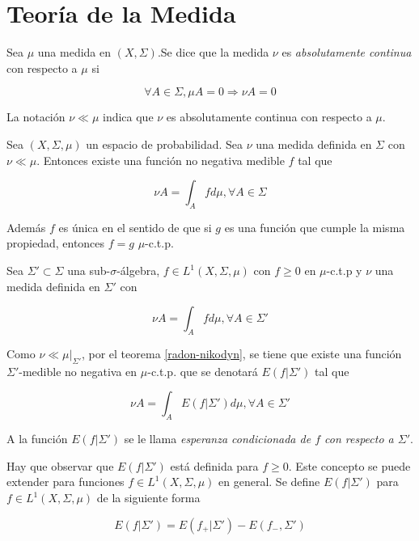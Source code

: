 \section{Teoría de la Medida}

\begin{definicion}
	Sea $\mu$ una medida en $(X,\Sigma)$.Se dice que la medida $\nu$ es \textit{absolutamente continua} con respecto a $\mu$ si
	
	\begin{equation}
		\forall A \in \Sigma, \mu A = 0 \Rightarrow \nu A = 0
	\end{equation}
	
	La notación $\nu \ll \mu$ indica que $\nu$ es absolutamente continua con respecto a $\mu$.
\end{definicion}

\begin{teorema}\label{radon-nikodyn}
	Sea $(X,\Sigma,\mu)$ un espacio de probabilidad. Sea $\nu$ una medida definida en $\Sigma$ con $\nu \ll \mu$. Entonces existe una función no negativa medible $f$ tal que
	
	\begin{equation}
		\nu A = \int_A f d\mu, \forall A \in \Sigma
	\end{equation}
	
	Además $f$ es única en el sentido de que si $g$ es una función que cumple la misma propiedad, entonces $f = g$ $\mu$-c.t.p.
\end{teorema}

\begin{definicion}
	Sea $\Sigma' \subset \Sigma$ una sub-$\sigma$-álgebra, $f \in L^1(X,\Sigma,\mu)$ con $f \geq 0$ en $\mu$-c.t.p y $\nu$ una medida definida en $\Sigma'$ con
	
	\begin{equation}
		\nu A = \int_A f d\mu, \forall A \in \Sigma'
	\end{equation}
	
	Como $\nu \ll \mu|_{\Sigma'}$, por el teorema \ref*{radon-nikodyn}, se tiene que existe una función $\Sigma'$-medible no negativa en $\mu$-c.t.p. que se denotará $E(f|\Sigma')$ tal que
	
	\begin{equation}
		\nu A = \int_A E(f|\Sigma') d\mu, \forall A \in \Sigma'
	\end{equation}
	
	A la función $E(f|\Sigma')$ se le llama \textit{esperanza condicionada de $f$ con respecto a $\Sigma'$}. 
\end{definicion}

Hay que observar que $E(f|\Sigma')$ está definida para $f \geq 0$. Este concepto se puede extender para funciones $f \in L^1(X,\Sigma,\mu)$ en general. Se define $E(f|\Sigma')$ para $f \in L^1(X,\Sigma,\mu)$ de la siguiente forma

\begin{equation}
	E(f|\Sigma') = E(f_+|\Sigma')- E(f_-,\Sigma')
\end{equation}